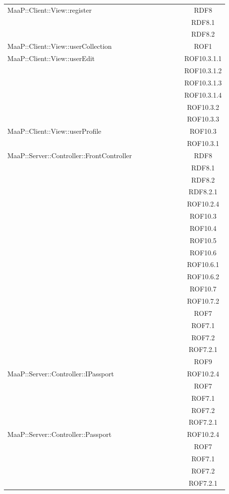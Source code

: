 \begin{center}
\begin{longtable}{|p{0.8\linewidth}|c|}
\midrule
MaaP::Client::View::register
& RDF8\\
& RDF8.1\\
& RDF8.2\\

\midrule
MaaP::Client::View::userCollection
& ROF1\\

\midrule
MaaP::Client::View::userEdit
& ROF10.3.1.1\\
& ROF10.3.1.2\\
& ROF10.3.1.3\\
& ROF10.3.1.4\\
& ROF10.3.2\\
& ROF10.3.3\\

\midrule
MaaP::Client::View::userProfile
& ROF10.3\\
& ROF10.3.1\\

\midrule
MaaP::Server::Controller::FrontController
& RDF8\\
& RDF8.1\\
& RDF8.2\\
& RDF8.2.1\\
& ROF10.2.4\\
& ROF10.3\\
& ROF10.4\\
& ROF10.5\\
& ROF10.6\\
& ROF10.6.1\\
& ROF10.6.2\\
& ROF10.7\\
& ROF10.7.2\\
& ROF7\\
& ROF7.1\\
& ROF7.2\\
& ROF7.2.1\\
& ROF9\\

\midrule
MaaP::Server::Controller::IPassport
& ROF10.2.4\\
& ROF7\\
& ROF7.1\\
& ROF7.2\\
& ROF7.2.1\\

\midrule
MaaP::Server::Controller::Passport
& ROF10.2.4\\
& ROF7\\
& ROF7.1\\
& ROF7.2\\
& ROF7.2.1\\


\end{longtable}
\end{center}
